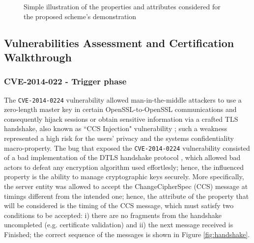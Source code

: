 \begin{figure}[ht]
    \centering
    \caption{Simple illustration of the properties and attributes considered for the proposed scheme's demonstration}
    \label{fig:proc_prop}
\end{figure}



\subsection{Vulnerabilities Assessment and Certification Walkthrough}
\subsubsection{CVE-2014-022 - Trigger phase}
The \texttt{CVE-2014-0224} vulnerability allowed man-in-the-middle attackers \cite{conti2016survey} to use a zero-length master key in certain OpenSSL-to-OpenSSL communications and consequently hijack sessions or obtain sensitive information via a crafted TLS handshake, also known as ``CCS Injection" vulnerability \cite{CCS}; such a weakness represented a high risk for the users' privacy and the systems confidentiality macro-property.
The bug that exposed the \texttt{CVE-2014-0224} vulnerability consisted of a bad implementation of the DTLS handshake protocol \cite{DTLS}, which allowed bad actors to defeat any encryption algorithm used effortlesly; hence, the influenced property is the ability to manage cryptographic keys securely. More specifically, the server entity was allowed to accept the ChangeCipherSpec (CCS) message at timings different from the intended one; hence, the attribute of the property that will be considered is the timing of the CCS message, which must satisfy two conditions to be accepted: i) there are no fragments from the handshake uncompleted (e.g. certificate validation) and ii) the next message received is Finished; the correct sequence of the messages is shown in Figure \ref{fig:handshake}.


